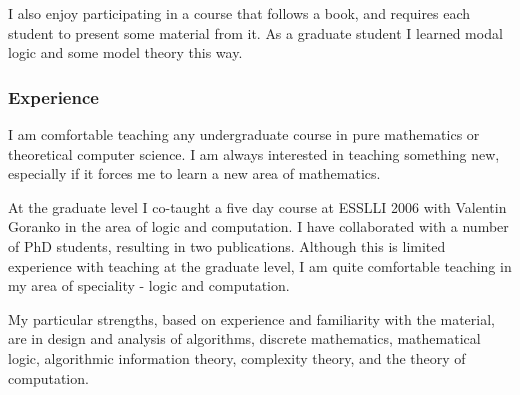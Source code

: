 \documentclass[12pt]{article}
\theoremstyle{plain} \numberwithin{equation}{section}
\theoremstyle{definition}
\begin{document}
I also enjoy participating in a course that follows a book, and requires each student to present some material from it. As a graduate student I learned modal logic and some model theory this way.

\subsubsection*{Experience}
I am comfortable teaching any undergraduate course in pure mathematics or theoretical computer science.
I am always interested in teaching something new, especially if it forces me to learn a new area of mathematics.

At the graduate level I co-taught a five day course at ESSLLI 2006 with Valentin Goranko in the area of logic and computation. I have collaborated with a number of PhD students, resulting in two publications. Although this is limited experience with teaching at the graduate level, I am quite comfortable teaching in my area of speciality - logic and computation.

My particular strengths, based on experience and familiarity with the material, are in design and analysis of algorithms,
discrete mathematics, mathematical logic, algorithmic information theory, complexity theory, and the theory of computation. 
\end{document}
